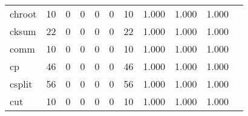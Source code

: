 \begin{longtable}{lp{1.2cm}p{1.2cm}p{1.2cm}p{1.2cm}p{1.2cm}p{1.2cm}p{1.2cm}p{1.2cm}p{1.2cm}p{1.2cm}}
chroot    &                                    10 &                                                  0 &                                                  0 &                                                  0 &                                                  0 &                                                 10 &                                              1.000 &                                              1.000 &                                              1.000 \\
cksum     &                                    22 &                                                  0 &                                                  0 &                                                  0 &                                                  0 &                                                 22 &                                              1.000 &                                              1.000 &                                              1.000 \\
comm      &                                    10 &                                                  0 &                                                  0 &                                                  0 &                                                  0 &                                                 10 &                                              1.000 &                                              1.000 &                                              1.000 \\
cp        &                                    46 &                                                  0 &                                                  0 &                                                  0 &                                                  0 &                                                 46 &                                              1.000 &                                              1.000 &                                              1.000 \\
csplit    &                                    56 &                                                  0 &                                                  0 &                                                  0 &                                                  0 &                                                 56 &                                              1.000 &                                              1.000 &                                              1.000 \\
cut       &                                    10 &                                                  0 &                                                  0 &                                                  0 &                                                  0 &                                                 10 &                                              1.000 &                                              1.000 &                                              1.000 \\

\end{longtable}
